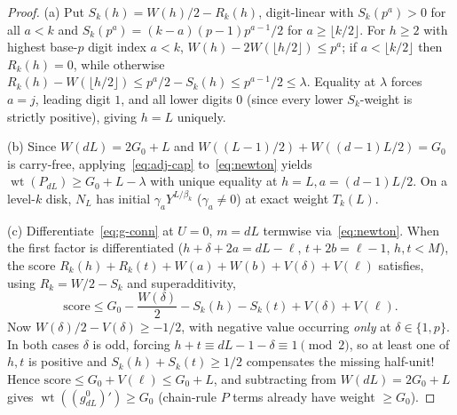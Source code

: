 \documentclass[11pt,reqno]{amsart}
\numberwithin{equation}{section}
\theoremstyle{definition}
\theoremstyle{remark}
\newcommand{\wt}{\operatorname{wt}}
\begin{document}
\begin{proof}
(a) Put $S_k(h) = W(h)/2 - R_k(h)$, digit-linear with $S_k(p^a)>0$ for all $a<k$ and $S_k(p^a)=(k-a)(p-1)p^{a-1}/2$ for $a\ge\lfloor k/2\rfloor$. For $h\ge 2$ with highest base-$p$ digit index $a<k$, $W(h)-2W(\lfloor h/2\rfloor)\le p^a$; if $a<\lfloor k/2\rfloor$ then $R_k(h)=0$, while otherwise $R_k(h)-W(\lfloor h/2\rfloor) \le p^a/2 - S_k(h) \le p^{a-1}/2 \le \lambda$. Equality at $\lambda$ forces $a=j$, leading digit $1$, and all lower digits $0$ (since every lower $S_k$-weight is strictly positive), giving $h=L$ uniquely.

(b) Since $W(dL)=2G_0+L$ and $W((L-1)/2)+W((d-1)L/2)=G_0$ is carry-free, applying~\eqref{eq:adj-cap} to~\eqref{eq:newton} yields $\wt(P_{dL})\ge G_0+L-\lambda$ with unique equality at $h=L, a=(d-1)L/2$. On a level-$k$ disk, $N_L$ has initial $\gamma_a Y^{L/\beta_k}$ ($\gamma_a\ne 0$) at exact weight $T_k(L)$.

(c) Differentiate~\eqref{eq:g-conn} at $U=0$, $m=dL$ termwise via~\eqref{eq:newton}. When the first factor is differentiated ($h+\delta+2a=dL-\ell$, $t+2b=\ell-1$, $h,t<M$), the score $R_k(h)+R_k(t)+W(a)+W(b)+V(\delta)+V(\ell)$ satisfies, using $R_k=W/2-S_k$ and superadditivity,
\[
\text{score} \le G_0 - \frac{W(\delta)}{2} - S_k(h) - S_k(t) + V(\delta) + V(\ell).
\]
Now $W(\delta)/2 - V(\delta)\ge -1/2$, with negative value occurring \emph{only} at $\delta\in\{1,p\}$. In both cases $\delta$ is odd, forcing $h+t \equiv dL-1-\delta \equiv 1\pmod 2$, so at least one of $h,t$ is positive and $S_k(h)+S_k(t)\ge 1/2$ compensates the missing half-unit! Hence $\text{score}\le G_0+V(\ell)\le G_0+L$, and subtracting from $W(dL)=2G_0+L$ gives $\wt((g_{dL}^0)')\ge G_0$ (chain-rule $P$ terms already have weight $\ge G_0$).
\end{proof}
\end{document}
